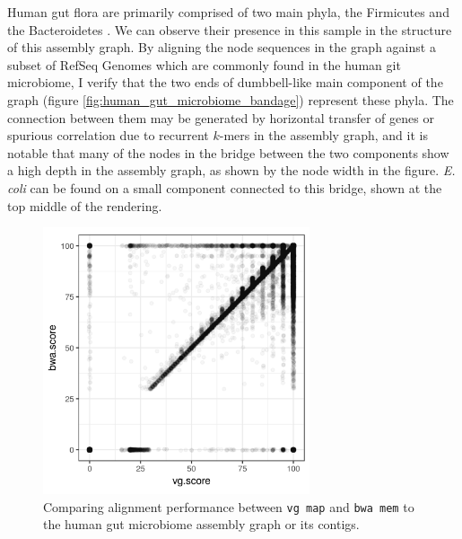 \documentclass[a4paper,12pt,numbered,oneside]{Classes/PhDThesisPSnPDF}
\begin{document}
Human gut flora are primarily comprised of two main phyla, the Firmicutes and the Bacteroidetes \cite{mahowald2009characterizing}.
We can observe their presence in this sample in the structure of this assembly graph.
By aligning the node sequences in the graph against a subset of RefSeq Genomes which are commonly found in the human git microbiome, I verify that the two ends of dumbbell-like main component of the graph (figure \ref{fig:human_gut_microbiome_bandage}) represent these phyla.
The connection between them may be generated by horizontal transfer of genes or spurious correlation due to recurrent $k$-mers in the assembly graph, and it is notable that many of the nodes in the bridge between the two components show a high depth in the assembly graph, as shown by the node width in the figure.
\emph{E. coli} can be found on a small component connected to this bridge, shown at the top middle of the rendering.

\begin{figure}[htbp!]
  \centering
  \includegraphics[width=0.7\textwidth]{Chapter3/Figs/human_gut_microbiome_SRS105153_holdout_vg_vs_bwa_scatter.png}
  \caption[Human gut microbiome alignment comparison]{
    Comparing alignment performance between {\tt vg map} and {\tt bwa mem} to the human gut microbiome assembly graph or its contigs.
  }
  \label{fig:human_gut_microbiome_scatter}
\end{figure}
\end{document}
